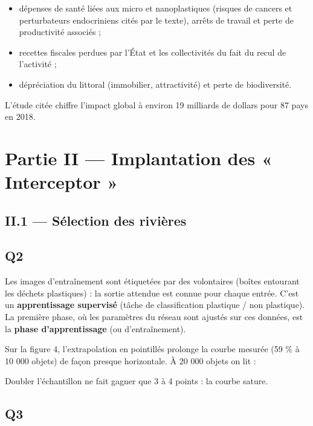 \documentclass[11pt,a4paper]{article}
\providecommand{\tightlist}{\setlength{\itemsep}{0pt}\setlength{\parskip}{0pt}}
\newcommand{\equationajustee}[1]{%
  \sbox{\boiteequation}{$\displaystyle #1$}%
  \ifdim\wd\boiteequation>\linewidth
    \[\resizebox{\linewidth}{!}{\usebox{\boiteequation}}\]%
  \else
    \[#1\]%
  \fi}
\begin{document}
\begin{itemize}
\tightlist
\item
  dépenses de santé liées aux micro et nanoplastiques (risques de cancers et perturbateurs endocriniens cités par le texte), arrêts de travail et perte de productivité associés ;
\item
  recettes fiscales perdues par l'État et les collectivités du fait du recul de l'activité ;
\item
  dépréciation du littoral (immobilier, attractivité) et perte de biodiversité.
\end{itemize}

L'étude citée chiffre l'impact global à environ 19 milliards de dollars pour 87 pays en 2018.

\hypertarget{partie-ii-implantation-des-interceptor}{%
\section{Partie II --- Implantation des « Interceptor »}\label{partie-ii-implantation-des-interceptor}}

\hypertarget{ii.1-suxe9lection-des-riviuxe8res}{%
\subsection{II.1 --- Sélection des rivières}\label{ii.1-suxe9lection-des-riviuxe8res}}

\hypertarget{q2}{%
\subsection{Q2}\label{q2}}

Les images d'entraînement sont étiquetées par des volontaires (boîtes entourant les déchets plastiques) : la sortie attendue est connue pour chaque entrée. C'est un \textbf{apprentissage supervisé} (tâche de classification plastique / non plastique). La première phase, où les paramètres du réseau sont ajustés sur ces données, est la \textbf{phase d'apprentissage} (ou d'entraînement).

Sur la figure 4, l'extrapolation en pointillés prolonge la courbe mesurée (59 \% à 10 000 objets) de façon presque horizontale. À 20 000 objets on lit :

\equationajustee{\boxed{\text{rappel maximal \text{espéré}}\approx 63\ \%}}

Doubler l'échantillon ne fait gagner que 3 à 4 points : la courbe sature.

\hypertarget{q3}{%
\subsection{Q3}\label{q3}}
\end{document}
